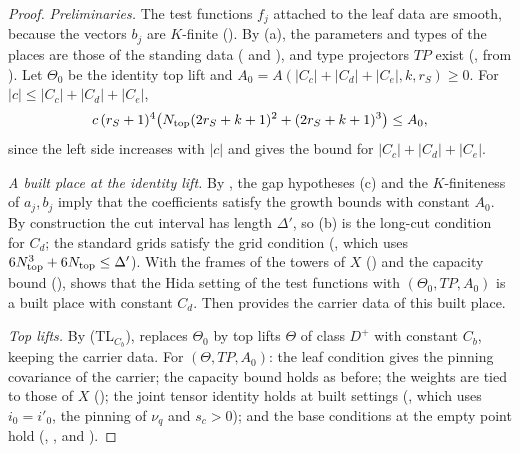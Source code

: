\begin{proof}
\emph{Preliminaries.} The test functions $f_j$ attached to the leaf data are smooth, because the vectors $b_j$ are $K$-finite
(). By (a), the parameters and types of the places are those of the
standing data ( and ), and type
projectors $TP$ exist (, from
). Let $\Theta_0$ be the identity top lift and
$A_0=A(|C_c|+|C_d|+|C_e|,k,r_S)\ge0$. For $|c|\le|C_c|+|C_d|+|C_e|$,
\[
c\,(r_S+1)^4\bigl(N_{\mathrm{top}}(2r_S+k+1)^2+(2r_S+k+1)^3\bigr)\le A_0,
\]
since the left side increases with $|c|$ and  gives the bound for
$|C_c|+|C_d|+|C_e|$.

\emph{A built place at the identity lift.} By , the gap hypotheses (c)
and the $K$-finiteness of $a_j,b_j$ imply that the coefficients satisfy the growth bounds with constant $A_0$. By construction the
cut interval has length $\Delta'$, so (b) is the long-cut condition for $C_d$; the
standard grids satisfy the grid condition (, which uses
$6N_{\mathrm{top}}^3+6N_{\mathrm{top}}\le\Delta'$). With the frames of the towers of $X$
() and the capacity bound
(), 
shows that the Hida setting of the test functions with $(\Theta_0,TP,A_0)$ is a built place with constant $C_d$. Then
 provides the carrier data of this built place.

\emph{Top lifts.} By (TL$_{C_b}$),  replaces $\Theta_0$ by top
lifts $\Theta$ of class $D^+$ with constant $C_b$, keeping the carrier data. For $(\Theta,TP,A_0)$: the leaf condition gives the
pinning covariance of the carrier; the capacity bound holds as before; the weights are tied to those of $X$
(); the joint tensor identity holds at built settings
(, which uses $i_0=i'_0$, the pinning of $\nu_q$ and $s_c>0$);
and the base conditions at the empty point hold
(, , and ).


\end{proof}

